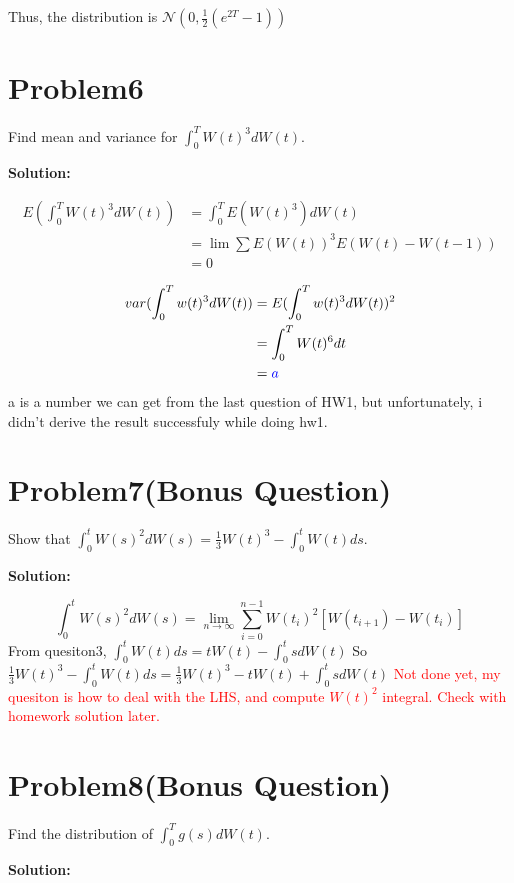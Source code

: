 \documentclass[11pt]{article} %
\begin{document}
Thus, the distribution is $\mathcal{N}(0,\frac{1}{2}(e^{2T}-1))$


\section*{Problem6}
Find mean and variance for $\int_0^T W(t)^3 dW(t)$.

\textbf{Solution:}

\begin{align*}
    E(\int_0^T W(t)^3 dW(t)) &= \int_0^T E(W(t)^3) dW(t)\\
                            &= \lim \sum E(W(t))^3 E(W(t)-W(t-1))\\
                            &= 0
\end{align*}

\begin{align*}
    var(\int_0^T w(t)^3 dW(t)) &=E(\int_0^T w(t)^3 dW(t))^2\\
                                &= \int_0^T W(t)^6 dt\\
                                &= \textcolor{blue}{a}
\end{align*}
a is a number we can get from the last question of HW1, but unfortunately, i didn't derive the result successfuly while doing hw1. 

\section*{Problem7(Bonus Question)}
Show that $\int_0^t W(s)^2 dW(s) = \frac{1}{3}W(t)^3 - \int_0^t W(t)ds$.

\textbf{Solution:}

\begin{equation*}
    \int_0^t W(s)^2 dW(s) = \lim_{n\rightarrow \infty} \sum_{i=0}^{n-1}W(t_i)^2[W(t_{i+1})-W(t_i)]
\end{equation*}
From quesiton3, $\int_0^t W(t)ds = tW(t)- \int_0^t s dW(t)$
So $\frac{1}{3}W(t)^3 - \int_0^t W(t)ds = \frac{1}{3}W(t)^3 -tW(t)+ \int_0^t s dW(t)$
\textcolor{red}{Not done yet, my quesiton is how to deal with the LHS, and compute $W(t)^2$ integral. Check with homework solution later.}

\section*{Problem8(Bonus Question)}
Find the distribution of $\int_0^T g(s)dW(t)$.

\textbf{Solution:}
\end{document}
